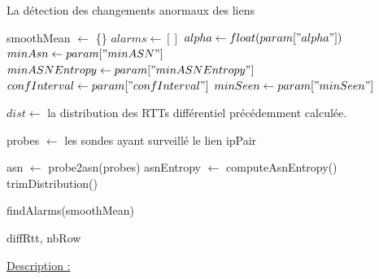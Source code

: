   \begin{algorithm}
  	\caption{La détection des changements anormaux des liens }
  	\begin{algorithmic}[1]
  		\State smoothMean $\leftarrow $ \{\} 
  		\State $ alarms  \leftarrow   [] $ 
  		\State $ alpha \leftarrow float(param["alpha"])$
  		\State $ minAsn \leftarrow  param["minASN"]$
  		\State $ minASNEntropy \leftarrow  param["minASNEntropy"]$
  		\State $ confInterval  \leftarrow  param["confInterval"]$
  		\State $minSeen  \leftarrow  param["minSeen"]$
  		
  		
  		\State $dist \leftarrow $ la distribution des RTTs différentiel précédemment calculée.
  		
  		\State probes $\leftarrow $ les sondes ayant surveillé le lien ipPair 
  		
  		\State asn $\leftarrow $  probe2asn(probes)
  		\State asnEntropy $\leftarrow $ computeAsnEntropy() 
  		\State  trimDistribution()
  		\EndWhile
  		
  		\State findAlarms(smoothMean)
  		
  		\EndFor
  		
  		\Return diffRtt, nbRow
  		
  		\EndFunction
  	\end{algorithmic}
  	\label{algo:step-alarmsDetectione}
  \end{algorithm}

\underline{Description : }

